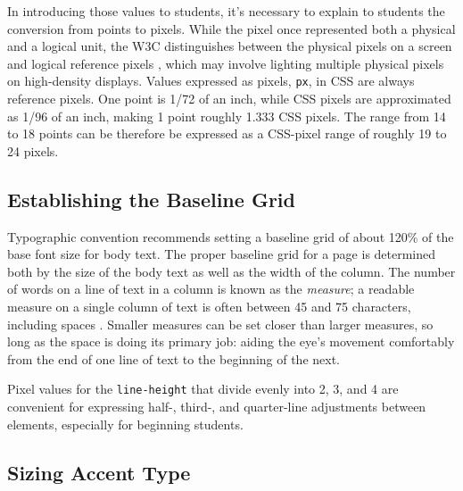 \documentclass[sigplan,screen]{acmart}
\begin{document}
In introducing those values to students, it’s necessary to explain to students the conversion from points to pixels. While the pixel once represented both a physical and a logical unit, the W3C distinguishes between the physical pixels on a screen and logical reference pixels \cite[§~5.2]{w3c:values}, which may involve lighting multiple physical pixels on high-density displays. Values expressed as pixels, \verb|px|, in CSS are always reference pixels. One point is 1/72 of an inch, while CSS pixels are approximated as 1/96 of an inch, making 1 point roughly 1.333 CSS pixels. The range from 14 to 18 points can be therefore be expressed as a CSS-pixel range of roughly 19 to 24 pixels.

\subsection{Establishing the Baseline Grid}

Typographic convention recommends setting a baseline grid of about 120\% of the base font size for body text. The proper baseline grid for a page is determined both by the size of the body text as well as the width of the column. The number of words on a line of text in a column is known as the {\itshape measure}; a readable measure on a single column of text is often between 45 and 75 characters, including spaces \cite[pp. 26–27]{rb:style}. Smaller measures can be set closer than larger measures, so long as the space is doing its primary job: aiding the eye's movement comfortably from the end of one line of text to the beginning of the next.

Pixel values for the \verb|line-height| that divide evenly into 2, 3, and 4 are convenient for  expressing half-, third-, and quarter-line adjustments between elements, especially for beginning students.

\subsection{Sizing Accent Type}
\end{document}
